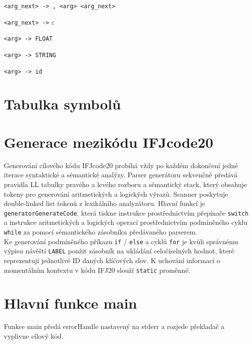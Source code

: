 \documentclass[a4paper, 12pt]{article}
\begin{document}
\begin{enumerate}[noitemsep]
{            \item \verb|<arg_next> -> , <arg> <arg_next>|
            \item \verb|<arg_next> ->| $\varepsilon$
            \item \verb|<arg> -> FLOAT|
            \item \verb|<arg> -> STRING|
            \item \verb|<arg> -> id| 
            }
            
            
        \end{enumerate} 

\newpage

\section{Tabulka symbolů}

\section{Generace mezikódu IFJcode20}
Generování cílového kódu IFJcode20 probíhá vždy po každém dokončení jedné iterace syntaktické a sémantické analýzy. Parser generátoru sekvenčně předává pravidla LL tabulky pravého a levého rozboru a sémantický stack, který obsahuje tokeny pro generování aritmetických a logických výrazů. Scanner poskytuje double-linked list tokenů z lexikálního analyzátoru.
\newline
\newline
Hlavní funkcí je \verb|generatorGenerateCode|, která tiskne instrukce prostřednictvím přepínače \verb|switch| a instrukce aritmetických a logických operací prostřednictvím podmíněného cyklu \verb|while| za pomocí sémantického zásobníku předávaného parserem.\\
\newline
Ke generování podmíněného příkazu \verb|if| / \verb|else| a cyklů \verb|for| je kvůli správnému výpisu návěští \verb|LABEL| použit zásobník na ukládání celočíselných hodnot, které reprezentují jednotlivé ID daných klíčových slov. K uchování informací o momentálním kontextu v kódu IFJ20 slouží \verb|static| proměnné.\\
\newline

\section{Hlavní funkce main}
Funkce main předá errorHandle nastavený na stderr a rozjede překladač a vyplivne cílový kód. 
\end{document}
